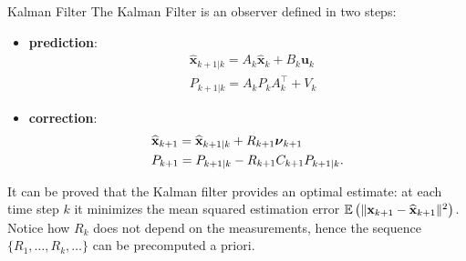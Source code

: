 \documentclass[10pt, a4paper]{report}
\begin{document}
\begin{boxdefinition}{Kalman Filter}{}
    The Kalman Filter is an observer defined in two steps:\begin{itemize}
        \item \textbf{prediction}:\begin{align}
            &\widehat{\mathbf x}_{k+1|k}=A_k\widehat{\mathbf x}_k+B_k\mathbf u_k\\
            &P_{k+1|k}=A_kP_kA_k^\top+V_k
        \end{align}
        \item \textbf{correction}:\begin{align}
            &\widehat{\mathbf x}_{k+1}=\widehat{\mathbf x}_{k+1|k}+R_{k+1}{\boldsymbol{\nu}}_{k+1}\\
            &P_{k+1}=P_{k+1|k}-R_{k+1}C_{k+1}P_{k+1|k}.
        \end{align}
    \end{itemize}
\end{boxdefinition}
It can be proved that the Kalman filter provides an optimal estimate: at each time step $k$ it minimizes the mean squared estimation error ${\mathbb E}\left(\|\mathbf x_{k+1}-\widehat{\mathbf x}_{k+1}\|^2\right)$. Notice how $R_{k}$ does not depend on the measurements, hence the sequence $\{R_1,\dots, R_k,\dots\}$ can be precomputed a priori.
\end{document}
